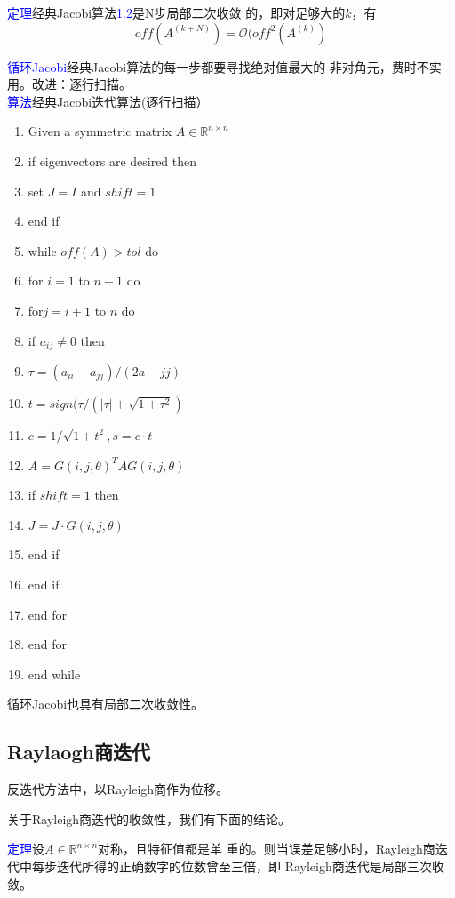 \documentclass[12pt,a4paper]{article}
\begin{document}
\textcolor{blue}{定理}\quad 经典Jacobi算法\textcolor{blue}{1.2}是N步局部二次收敛
的，即对足够大的$k$，有$$off(A^{(k+N)})=\mathcal O(off^2(A^{(k)})$$

    \textcolor{blue}{循环Jacobi}\quad 经典Jacobi算法的每一步都要寻找绝对值最大的
    非对角元，费时不实用。改进：逐行扫描。\\
\textcolor{blue}{算法}\quad 经典Jacobi迭代算法(逐行扫描）
\begin{enumerate}[1:]
 \item Given a symmetric matrix $A\in \mathbb R^{n\times n}$
 \item if eigenvectors are desired then
 \item \quad set $J=I$ and $shift=1$
 \item end if
 \item while $off(A)>tol$ do
 \item \quad for $i=1$ to $n-1$ do
 \item \qquad for$j=i+1$ to $n$ do
 \item \qquad \quad if $a_{ij}\neq 0$ then
 \item \qquad \qquad $\tau=(a_{ii}-a_{jj})/(2a-{jj})$
 \item \qquad \qquad $t=sign(\tau/(|\tau|+\sqrt{1+\tau ^2})$
 \item \qquad \qquad $c=1/\sqrt{1+t^2},s=c·t$
 \item \qquad \qquad $A=G(i,j,\theta)^TAG(i,j,\theta)$
 \item \qquad \qquad if $shift=1$ then
 \item \qquad \qquad \quad$J=J·G(i,j,\theta)$
 \item \qquad \qquad end if
     \item \qquad \quad end if
\item \qquad end for
\item \quad end for
 \item end while
 \end{enumerate}

循环Jacobi也具有局部二次收敛性。
\subsection{Raylaogh商迭代}
反迭代方法中，以Rayleigh商作为位移。

关于Rayleigh商迭代的收敛性，我们有下面的结论。

\textcolor{blue}{定理}\quad 设$A\in \mathbb R^{n\times n}$对称，且特征值都是单
重的。则当误差足够小时，Rayleigh商迭代中每步迭代所得的正确数字的位数曾至三倍，即
Rayleigh商迭代是局部三次收敛。
\end{document}
